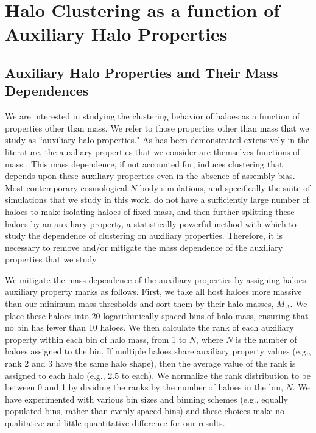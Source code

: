\documentclass[usenatbib,fleqn]{mnras}
\begin{document}
\section[]{Halo Clustering as a function of Auxiliary Halo Properties}
\label{section:methodology}

\subsection{Auxiliary Halo Properties and Their Mass Dependences}
\label{subsection:properties}

We are interested in studying the clustering behavior of haloes as a function of properties other than mass. We refer to those properties other than mass that we study as ``auxiliary halo properties." As has been demonstrated extensively in the literature, the auxiliary properties that we consider are themselves functions of mass \citep{bullock_etal02,allgood_etal06, duffy_etal08, despali_etal16}. This mass dependence, if not accounted for, induces clustering that depends upon these auxiliary properties even in the absence of assembly bias. Most contemporary cosmological $N$-body simulations, and specifically the suite of simulations that we study in this work, do not have a sufficiently large number of haloes to make isolating haloes of fixed mass, and then further splitting these haloes by an auxiliary property, a statistically powerful method with which to study the dependence of clustering on auxiliary properties. Therefore, it is necessary to remove and/or mitigate the mass dependence of the auxiliary properties that we study. 

We mitigate the mass dependence of the auxiliary properties by assigning haloes auxiliary property marks as follows. First, we take all host haloes more massive than our minimum mass thresholds and sort them by their halo masses, $M_{\Delta}$. We place these haloes into 20 logarithmically-spaced bins of halo mass, ensuring that no bin has fewer than 10 haloes. We then calculate the rank of each auxiliary property within each bin of halo mass, from 1 to $N$, where $N$ is the number of haloes assigned to the bin. If multiple haloes share auxiliary property values (e.g., rank 2 and 3 have the same halo shape), then the average value of the rank is assigned to each halo (e.g., 2.5 to each). We normalize the rank distribution to be between 0 and 1 by dividing the ranks by the number of haloes in the bin, $N$. We have experimented with various bin sizes and binning schemes (e.g., equally populated bins, rather than evenly spaced bins) and these choices make no qualitative and little quantitative difference for our results.
\end{document}

